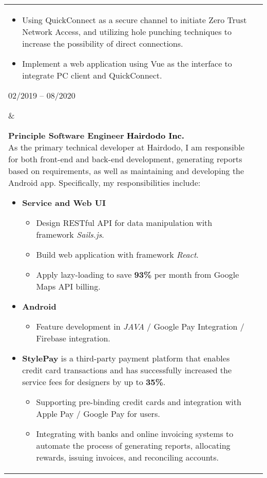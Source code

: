 \documentclass[10pt,A4]{article}
\makeatletter
\newcounter{a}
\newcounter{b}
\newcounter{c}
\newenvironment{entrylist}{%
	\begin{tabular*}{\textwidth}[t]{@{\extracolsep{\fill}}ll}
	}{%
	\end{tabular*}
}
\newcommand{\entry}[4]{%
	\parbox[t]{3.5cm}{%
		#1%
	}%
	&\parbox[t]{14cm}{%
		\textbf{#2}%
		\hfill%
		{\footnotesize \textbf{\textcolor{black}{#3}}}\\%
		#4%
	}\\\\}
\makeatother
\begin{document}
\begin{entrylist}
{\begin{itemize}[leftmargin=*]
\begin{itemize}
						\item Using QuickConnect as a secure channel to initiate Zero Trust Network Access, and utilizing hole punching techniques to increase the possibility of direct connections.
						\item Implement a web application using Vue as the interface to integrate PC client and QuickConnect.
					\end{itemize}
				\end{itemize}
					}
		\entry
		{02/2019 – 08/2020}
		{Principle Software Engineer}
		{Hairdodo Inc.}
		{As the primary technical developer at Hairdodo, I am responsible for both front-end and back-end development, generating reports based on requirements, as well as maintaining and developing the Android app. Specifically, my responsibilities include:\\
		\begin{itemize}[leftmargin=*]
			\vspace{-0.5\baselineskip}
			\item \textbf{Service and Web UI}
			\begin{itemize} \normalsize
				\item Design RESTful API for data manipulation with framework \textit{Sails.js}.
				\item Build web application with framework \textit{React}.
				\item Apply lazy-loading to save \textbf{93\%} per month from Google Maps API billing.
			\end{itemize}
			\item \textbf{Android}
			\begin{itemize} \normalsize
				\item Feature development in \textit{JAVA} / Google Pay Integration / Firebase integration.
			\end{itemize}
			\item \textbf{StylePay} \small is a third-party payment platform that enables credit card transactions and has successfully increased the service fees for designers by up to \textbf{35\%}.
			\begin{itemize} \normalsize
				\item Supporting pre-binding credit cards and integration with Apple Pay / Google Pay for users.
				\item Integrating with banks and online invoicing systems to automate the process of generating reports, allocating rewards, issuing invoices, and reconciling accounts.
			\end{itemize}
		\end{itemize}
		}
		\entry
		{2015 – 06/2018}
		{Software Engineer}
		{Synology Inc.}
		{
			\begin{itemize}[leftmargin=*]
				\vspace{-0.5\baselineskip}
				\item Renovate live streaming mechanism By integrating FFmpeg / WebSocket / HTML5 and MSE(Media Source Extension)
			\end{itemize}}
	\end{entrylist}
	\\\\
\end{document}

